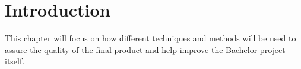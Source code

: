 \section{Introduction}
This chapter will focus on how different techniques and methods will be used to assure the quality of the final product and help improve the Bachelor project itself.